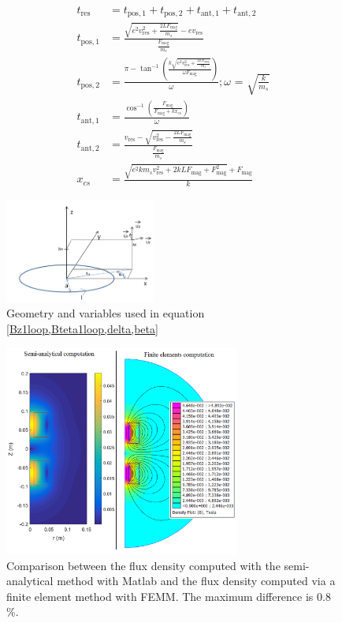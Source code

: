 \documentclass[letterpaper, 10 pt, conference]{ieeeconf}  %
\begin{document}
\begin{align}
\label{tres6}
t_\text{res}&=t_{\text{pos},1}+t_{\text{pos},2}+t_{\text{ant},1}+t_{\text{ant},2}\\
\label{tres1}
t_{\text{pos},1}&=\frac{\sqrt{e^2 v_{\text{res}}^2+\frac{2 L F_{\text{mag}}}{m_s}}-e v_{\text{res}}}{\frac{F_{\text{mag}}}{m_s}}\\
t_{\text{pos},2}&=\frac{\pi -\tan ^{-1}\left(\frac{k \sqrt{e^2 v_{\text{res}}^2+\frac{2 L F_{\text{mag}}}{m_s}}}{\omega  F_{\text{mag}}}\right)}{\omega } ; \text{$\omega $ = }
\sqrt{\frac{k}{m_s}}
\label{tres2}\\
t_{\text{ant},1}&=\frac{\cos ^{-1}\left(\frac{F_{\text{mag}}}{F_{\text{mag}}+k x_{cs}}\right)}{\omega }
\label{tres3}\\
t_{\text{ant},2}&=\frac{v_{\text{res}}-\sqrt{v_{\text{res}}^2-\frac{2 L F_{\text{mag}}}{m_s}}}{\frac{F_{\text{mag}}}{m_s}}
\label{tres4}\\
x_{cs}&=\frac{\sqrt{e^2 k m_s v_{\text{res}}^2+2 k L F_{\text{mag}}+F_{\text{mag}}^2}+F_{\text{mag}}}{k}
\label{tres5}
\end{align}
\begin{figure}\centering
	\includegraphics[width=140pt]{single_loop.png}
	\caption{Geometry and variables used in equation \cref{Bz1loop,Bteta1loop,delta,beta}}
	\label{single_loop_geometry}
\end{figure}

\begin{figure}\centering
	\includegraphics[width=220pt]{Femm_matlab_comparison.png}
	\caption{Comparison between the flux density computed with the semi-analytical method with {\sc Matlab} and the flux density computed via a finite element method with FEMM. The maximum difference is 0.8 \%.}
	\label{Femm_matlab_comparison}
\end{figure}
\end{document}
